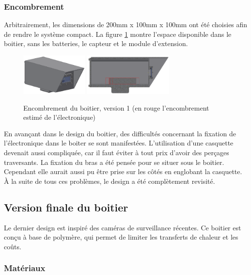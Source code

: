 \subsubsection{Encombrement}

Arbitrairement, les dimensions de 200mm x 100mm x 100mm ont été choisies afin de rendre le système
compact. La figure \ref{fig:encombrementv1} montre l'espace disponible dans le boitier, sans 
les batteries, le capteur et le module d'extension.

\begin{figure}[H]
    \centering
    \includegraphics[width=0.3\textwidth]{Images/photos_PGA/boitierV3.PNG}
    \includegraphics[width=0.4\textwidth]{Images/photos_PGA/boitierV3enc.PNG}
    \caption{Encombrement du boitier, version 1 (en rouge l'encombrement estimé de l’électronique)}
    \label{fig:encombrementv1}
\end{figure}

En avançant dans le design du boitier, des difficultés concernant la fixation de l’électronique dans le boiter 
se sont manifestées. L’utilisation d’une casquette devenait aussi compliquée, car il faut éviter à tout prix d'avoir
des perçages traversants. La fixation du bras a été pensée pour se situer
sous le boitier. Cependant elle aurait aussi pu être prise sur les côtés en englobant la casquette. 
À la suite de tous ces problèmes, le design a été complètement revisité.

\subsection{Version finale du boitier}

Le dernier design est inspiré des caméras de surveillance récentes. Ce boitier est conçu à base de 
polymère, qui permet de limiter les transferts de chaleur et les coûts.

\subsubsection{Matériaux}

